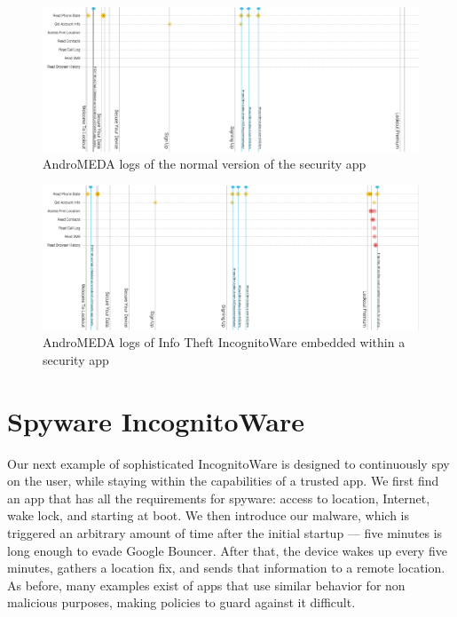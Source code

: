 \begin{figure}[h]
\begin{center}
\includegraphics[width=1.0\columnwidth]{figs/AndroMEDA_Lookout_Notmalware}
\caption{AndroMEDA logs of the normal version of the security app }
\label{fig:infotheft_logs_nonmalware}
\end{center}
\end{figure}

\begin{figure}[h]
\begin{center}
\includegraphics[width=1.0\columnwidth]{figs/AndroMEDA_Lookout_Malware}
\caption{AndroMEDA logs of Info Theft IncognitoWare embedded within a security app }
\label{fig:infotheft_logs_malware}
\end{center}
\end{figure}




\section{Spyware IncognitoWare}
Our next example of sophisticated IncognitoWare is designed to continuously spy on the user, while staying within the capabilities of a trusted app. We first find an app that has all the requirements for spyware: access to location, Internet, wake lock, and starting at boot. We then introduce our malware, which is triggered an arbitrary amount of time after the initial startup --- five minutes is long enough to evade Google Bouncer\citep{mansfield2012android}. After that, the device wakes up every five minutes, gathers a location fix, and sends that information to a remote location. As before, many examples exist of apps that use similar behavior for non malicious purposes, making policies to guard against it difficult.

